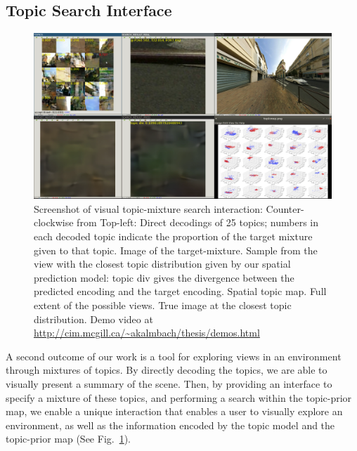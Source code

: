 \subsection{Topic Search Interface}
\begin{figure}
    \centering
    \includegraphics[width=\textwidth]{figures/ptz/interaction.png}
    \caption{Screenshot of visual topic-mixture search interaction: Counter-clockwise from Top-left: Direct decodings of 25 topics; numbers in each decoded topic indicate the proportion of the target mixture given to that topic. Image of the target-mixture. Sample from the view with the closest topic distribution given by our spatial prediction model: topic div gives the divergence between the predicted encoding and the target encoding. Spatial topic map. Full extent of the possible views. True image at the closest topic distribution. Demo video at \protect\url{http://cim.mcgill.ca/\~akalmbach/thesis/demos.html}}
    \label{fig:interaction}
\end{figure}

A second outcome of our work is a tool for exploring views in an environment through mixtures of topics. By directly decoding the topics, we are able to visually present a summary of the scene. Then, by providing an interface to specify a mixture of these topics, and performing a search within the topic-prior map, we enable a unique interaction that enables a user to visually explore an environment, as well as the information encoded by the topic model and the topic-prior map (See Fig.~\ref{fig:interaction}).

